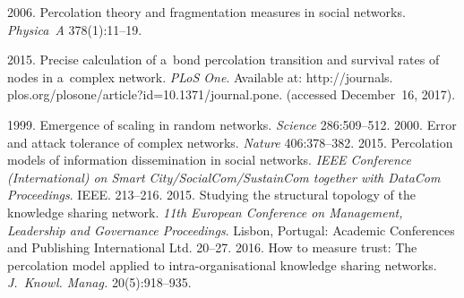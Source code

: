 \begin{multicols}{2}
{{\begin{thebibliography}{99}
 2006. Percolation theory and fragmentation measures in social networks. 
\textit{Physica~A} 378(1):11--19.

 2015. Precise 
calculation of a~bond percolation transition and survival rates of nodes in a~complex 
network. \textit{PLoS One}. Available at:  {\sf 
http://journals. plos.org/plosone/article?id=10.1371/journal.pone.} (accessed 
December~16, 2017).


 1999. Emergence of 
scaling in random networks. \textit{Science} 286:509--512.
 2000. Error 
and attack tolerance of complex networks. \textit{Nature} 406:378--382.
 2015. Percolation models of information 
dissemination in social networks. \textit{IEEE Conference (International) on Smart 
City/SocialCom/SustainCom together with DataCom Proceedings}. IEEE.
213--216.
 2015. Studying the 
structural topology of the knowledge sharing network. \textit{11th European 
Conference on Management, Leadership and Governance Proceedings}. 
Lisbon, Portugal: Academic Conferences and 
Publishing International Ltd. 20--27. 
 2016. How to measure 
trust: The percolation model applied to intra-organisational knowledge sharing 
networks. \textit{J.~Knowl. Manag.} 20(5):918--935.
\end{thebibliography}

 }
 }

\end{multicols}

\vspace*{-9pt}

